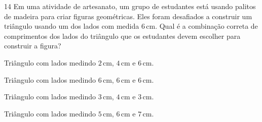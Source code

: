 

\num{14} Em uma atividade de artesanato, um grupo de estudantes está usando
palitos de madeira para criar figuras geométricas. Eles foram desafiados a
construir um triângulo usando um dos lados com medida $6\,\text{cm}$.
Qual é a combinação correta de comprimentos dos lados do triângulo que os
estudantes devem escolher para construir a figura?

\begin{escolha}
\item Triângulo com lados medindo $2\,\text{cm}$, $4\,\text{cm}$ e $6\,\text{cm}$.

\item Triângulo com lados medindo $6\,\text{cm}$, $6\,\text{cm}$ e $6\,\text{cm}$.

\item Triângulo com lados medindo $3\,\text{cm}$, $4\,\text{cm}$ e $3\,\text{cm}$.

\item Triângulo com lados medindo $5\,\text{cm}$, $6\,\text{cm}$ e $7\,\text{cm}$.
\end{escolha}



